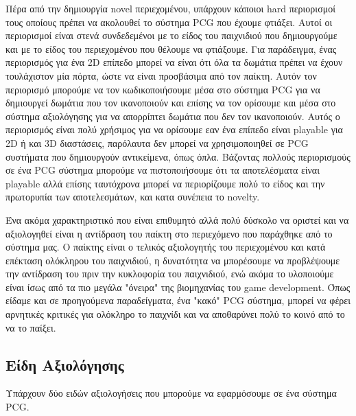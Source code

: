 Πέρα από την δημιουργία novel περιεχομένου, υπάρχουν κάποιοι hard περιορισμοί τους οποίους πρέπει να ακολουθεί το σύστημα PCG που έχουμε φτιάξει. Αυτοί οι περιορισμοί είναι στενά συνδεδεμένοι με το είδος του παιχνιδιού που δημιουργούμε και με το είδος του περιεχομένου που θέλουμε να φτιάξουμε. Για παράδειγμα, ένας περιορισμός για ένα 2D επίπεδο μπορεί να είναι ότι όλα τα δωμάτια πρέπει να έχουν τουλάχιστον μία πόρτα, ώστε να είναι προσβάσιμα από τον παίκτη. Αυτόν τον περιορισμό μπορούμε να τον κωδικοποιήσουμε μέσα στο σύστημα PCG για να δημιουργεί δωμάτια που τον ικανοποιούν και επίσης να τον ορίσουμε και μέσα στο σύστημα αξιολόγησης για να απορρίπτει δωμάτια που δεν τον ικανοποιούν. Αυτός ο περιορισμός είναι πολύ χρήσιμος για να ορίσουμε εαν ένα επίπεδο είναι playable για 2D ή και 3D διαστάσεις, παρόλαυτα δεν μπορεί να χρησιμοποιηθεί σε PCG συστήματα που δημιουργούν αντικείμενα, όπως όπλα. Βάζοντας πολλούς περιορισμούς σε ένα PCG σύστημα μπορούμε να πιστοποιήσουμε ότι τα αποτελέσματα είναι playable αλλά επίσης ταυτόχρονα μπορεί να περιορίζουμε πολύ το είδος και την πρωτορυπία των αποτελεσμάτων, και κατα συνέπεια το novelty.
\par
Ένα ακόμα χαρακτηριστικό που είναι επιθυμητό αλλά πολύ δύσκολο να οριστεί και να αξιολογηθεί είναι η αντίδραση του παίκτη στο περιεχόμενο που παράχθηκε από το σύστημα μας. Ο παίκτης είναι ο τελικός αξιολογητής του περιεχομένου και κατά επέκταση ολόκληρου του παιχνιδιού, η δυνατότητα να μπορέσουμε να προβλέψουμε την αντίδραση του πριν την κυκλοφορία του παιχνιδιού, ενώ ακόμα το υλοποιούμε είναι ίσως από τα πιο μεγάλα "όνειρα" της βιομηχανίας του game development. Όπως είδαμε και σε προηγούμενα παραδείγματα, ένα "κακό" PCG σύστημα, μπορεί να φέρει αρνητικές κριτικές για ολόκληρο το παιχνίδι και να αποθαρύνει πολύ το κοινό από το να το παίξει. 


\subsection{Είδη Αξιολόγησης}
Υπάρχουν δύο ειδών αξιολογήσεις που μπορούμε να εφαρμόσουμε σε ένα σύστημα PCG. 

